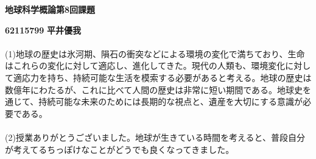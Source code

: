 \documentclass[a4paper,10.5pt]{ltjsarticle}
\begin{document}
\centerline
{\huge \bfseries 地球科学概論第8回課題}
\leftline
{\bfseries 62115799}
{\bfseries 平井優我}\\
\\
(1)地球の歴史は氷河期、隕石の衝突などによる環境の変化で満ちており、生命はこれらの変化に対して適応し、進化してきた。現代の人類も、環境変化に対して適応力を持ち、持続可能な生活を模索する必要があると考える。地球の歴史は数億年にわたるが、これに比べて人間の歴史は非常に短い期間である。地球史を通じて、持続可能な未来のためには長期的な視点と、遺産を大切にする意識が必要である。\\
\\
(2)授業ありがとうございました。地球が生きている時間を考えると、普段自分が考えてるちっぽけなことがどうでも良くなってきました。
\end{document}
